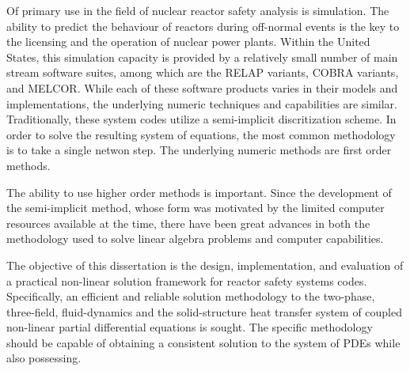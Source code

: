 
Of primary use in the field of nuclear reactor safety analysis is simulation.
The ability to predict the behaviour of reactors during off-normal events is the key to the licensing and the operation of nuclear power plants.
Within the United States, this simulation capacity is provided by a relatively small number of main stream software suites, among which are the RELAP variants, COBRA variants, and MELCOR.
While each of these software products varies in their models and implementations, the underlying numeric techniques and capabilities are similar.
Traditionally, these system codes utilize a semi-implicit discritization scheme.
In order to solve the resulting system of equations, the most common methodology is to take a single netwon step. 
The underlying numeric methods are first order methods.

The ability to use higher order methods is important.
Since the development of the semi-implicit method, whose form was motivated by the limited computer resources available at the time, there have been great advances in both the methodology used to solve linear algebra problems and computer capabilities.

The objective of this dissertation is the design, implementation, and evaluation of a practical non-linear solution framework for reactor safety systems codes.
Specifically, an efficient and reliable solution methodology to the two-phase, three-field, fluid-dynamics and the solid-structure heat transfer system of coupled non-linear partial differential equations is sought.
The specific methodology should be capable of obtaining a consistent solution to the system of PDEs while also possessing.